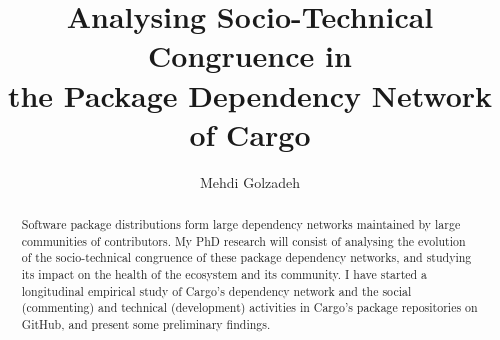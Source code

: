



\renewcommand\footnotetextcopyrightpermission[1]{} %
\pagestyle{plain}

\usepackage{amssymb}%
\usepackage{pifont}%

\newcommand{\commentty}[1]{{\color{blue} \sf (TY: #1)}}
\newcommand{\commentlh}[1]{{\color{red} \sf (LH: #1)}}

\def\BibTeX{{\rm B\kern-.05em{\sc i\kern-.025em b}\kern-.08em
		T\kern-.1667em\lower.7ex\hbox{E}\kern-.125emX}}





	
\title{Analysing Socio-Technical Congruence in\\ the Package Dependency Network of Cargo}

	\author{Mehdi Golzadeh}
	
	\newcommand*{\Scale}[2][4]{\scalebox{#1}{$#2$}}%
	\newcommand{\Tool}{ComAir\xspace}
	\newcommand{\ComBugs}{30\xspace}
	
	
	
	
	
\begin{abstract}
Software package distributions form large dependency networks maintained by large communities of contributors. My PhD research will consist of analysing the evolution of the socio-technical congruence of these package dependency networks, and studying its impact on the health of the ecosystem and its community.
I have started a longitudinal empirical study of Cargo's dependency network and the social (commenting) and technical (development) activities in Cargo's package repositories on GitHub, and present some preliminary findings.
\end{abstract}
	
